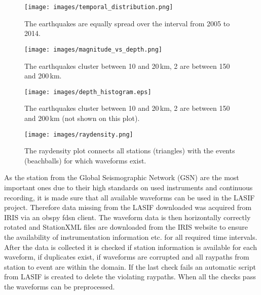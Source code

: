 \begin{figure}[H]
\begin{center}
\texttt{[image: images/temporal\_distribution.png]}
\caption{The earthquakes are equally spread over the interval from 2005 to 2014.}
\label{temp_dist}
\end{center}
\end{figure}

\begin{figure}[H]
\begin{center}
\texttt{[image: images/magnitude\_vs\_depth.png]}
\caption{The earthquakes cluster between 10 and 20\,km, 2 are between 150 and 200\,km.}
\label{depth_scatter}
\end{center}
\end{figure}

\begin{figure}[H]
\begin{center}
\texttt{[image: images/depth\_histogram.eps]}
\caption{The earthquakes cluster between 10 and 20\,km, 2 are between 150 and 200\,km (not shown on this plot).}
\label{depth_dist}
\end{center}
\end{figure}

\begin{figure}[H]
\begin{center}
\texttt{[image: images/raydensity.png]}
\caption{The raydensity plot connects all stations (triangles) with the events (beachballs) for which waveforms exist.}
\label{raydens}
\end{center}
\end{figure}

As the station from the Global Seismographic Network (GSN) are the most important ones due to their high standards on used 
instruments and continuous recording, it is made sure that all available waveforms can be used in the LASIF project. 
Therefore data missing from the LASIF downloaded was acquired from IRIS via an obspy fdsn client. 
The waveform data is then horizontally correctly rotated and StationXML files are downloaded from the IRIS website to
ensure the availability of instrumentation information etc. for all required time intervals. \\

After the data is collected it is checked if station information is available for each waveform, if duplicates exist, if 
waveforms are corrupted and all raypaths from station to event are within the domain. 
If the last check fails an automatic script from LASIF is created to delete the violating raypaths. 
When all the checks pass the waveforms can be preprocessed. 

